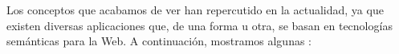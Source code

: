 %
%
%
%
%
%
%




Los conceptos que acabamos de ver han repercutido en la actualidad, ya que existen diversas aplicaciones que, de una forma u otra, se basan en tecnologías semánticas para la Web. A continuación, mostramos algunas \cite{cwb}:

